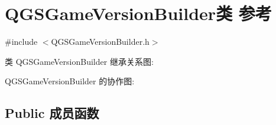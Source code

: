 \hypertarget{class_q_g_s_game_version_builder}{}\section{Q\+G\+S\+Game\+Version\+Builder类 参考}
\label{class_q_g_s_game_version_builder}


{\ttfamily \#include $<$Q\+G\+S\+Game\+Version\+Builder.\+h$>$}



类 Q\+G\+S\+Game\+Version\+Builder 继承关系图\+:


Q\+G\+S\+Game\+Version\+Builder 的协作图\+:
\subsection*{Public 成员函数}
